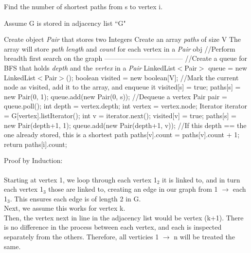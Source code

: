 \documentclass[12pt]{article}
\begin{document}
\begin{algorithm}[H]
\caption{Find the number of shortest paths from s to vertex i.}
\begin{algorithmic}
\State Assume G is stored in adjacency list ``G"

\State 
\State Create object \textit{Pair} that stores two Integers
\State Create an array \textit{paths} of size V
\State The array will store \textit{path length} and \textit{count} for each vertex in a \textit{Pair} obj
\State
\State //Perform breadth first search on the graph -----------------------------------
\State
\State //Create a queue for BFS that holds \textit{depth} and the \textit{vertex} in a \textit{Pair}
\State LinkedList$<$Pair$>$ queue = new LinkedList$<$Pair$>$();
\State boolean visited = new boolean[V];
\State
\State //Mark the current node as visited, add it to the array, and enqueue it 
\State visited[s] = true; 
\State paths[s] = new Pair(0, 1);
\State queue.add(new Pair(0, s)); 
\State
{}
\State //Dequeue a vertex
\State Pair pair = queue.poll(); 
\State int depth = vertex.depth;
\State int vertex = vertex.node;
\State
\State Iterator iterator = G[vertex].listIterator();
\State int v = iterator.next(); 
\State
{}
\State visited[v] = true; 
\State paths[s] = new Pair(depth+1, 1);
\State queue.add(new Pair(depth+1, v));
\State
{}
\State //If this depth == the one already stored, this is a shortest path
\State paths[v].count = paths[v].count + 1;
\EndIf
\EndWhile
\EndWhile
\State return paths[i].count;

\end{algorithmic}
\end{algorithm}
\noindent Proof by Induction:\\\\
\noindent Starting at vertex 1, we loop through each vertex 1$_2$ it is linked to, and in turn each vertex 1$_3$ those are linked to, creating an edge in our graph from 1 $\to$ each 1$_3$. This ensures each edge is of length 2 in G.\\
Next, we assume this works for vertex k.\\
Then, the vertex next in line in the adjacency list would be vertex (k+1). There is no difference in the process between each vertex, and each is inspected separately from the others. Therefore, all verticies 1 $\to$ n will be treated the same.\\\\
 
\end{document}
